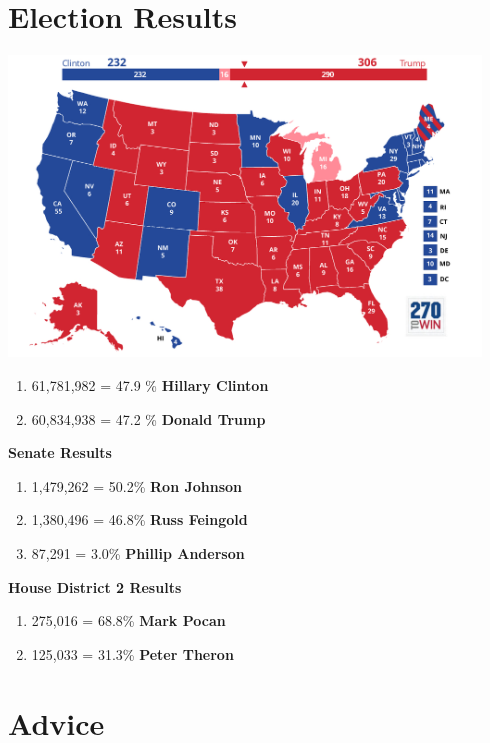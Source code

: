 \documentclass[twoside]{article}
\begin{document}
              \section{Election Results}
              {
              \centering
              \includegraphics[width=\textwidth,height=8cm,keepaspectratio]{images/results/electoral.jpg}
              \begin{enumerate}
                \item {\Large61,781,982 = 47.9 \% \bfseries{Hillary Clinton}}
                \item {\LARGE60,834,938 = 47.2 \% \bfseries{\LARGE Donald Trump}}
              \end{enumerate}
              \vskip2cm
              \bfseries{\LARGE Senate Results}
              \begin{enumerate}
                \item {\Large1,479,262 = 50.2\% \bfseries{Ron Johnson}}
                \item 1,380,496 = 46.8\% \bfseries{Russ Feingold}
                \item 87,291 = 3.0\% \bfseries{Phillip Anderson}
              \end{enumerate}\vskip1cm
              \bfseries{\LARGE House District 2 Results}
              \begin{enumerate}
                \item {\Large 275,016 = 68.8\% \bfseries{Mark Pocan}}
                \item 125,033 = 31.3\% \bfseries{Peter Theron}
              \end{enumerate}}\newpage
              \section{Advice}
\end{document}
